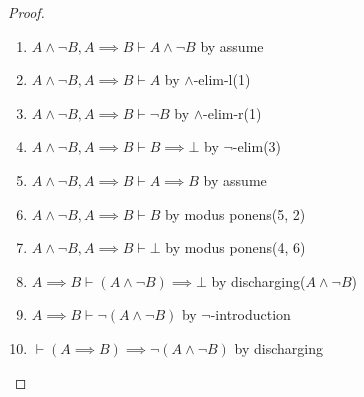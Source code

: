 \begin{proof}
\begin{enumerate}
\item $A\land\neg B, A\implies B\vdash A\land\neg B$ by assume
\item $A\land\neg B, A\implies B\vdash A$ by $\land$-elim-l(1)
\item $A\land\neg B, A\implies B\vdash\neg B$ by $\land$-elim-r(1)
\item $A\land\neg B, A\implies B\vdash B\implies\bot$ by $\neg$-elim(3)
\item $A\land\neg B, A\implies B\vdash A\implies B$ by assume
\item $A\land\neg B, A\implies B\vdash B$ by modus ponens(5, 2)
\item $A\land\neg B, A\implies B\vdash \bot$ by modus ponens(4, 6)
\item $A\implies B\vdash(A\land\neg B)\implies \bot$ by discharging($A\land\neg B$)
\item $A\implies B\vdash\neg(A\land\neg B)$ by $\neg$-introduction
\item $\vdash(A\implies B)\implies\neg(A\land\neg B)$ by discharging\qedhere
\end{enumerate}
\end{proof}


